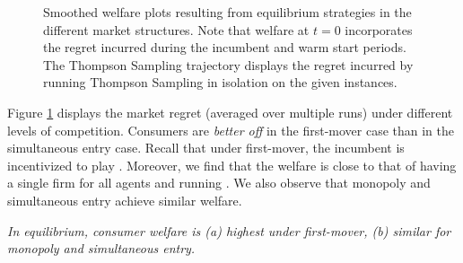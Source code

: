 \documentclass[../competing_bandits_with_appendix.tex]{subfiles}
\begin{document}
\begin{figure}[bth]
\caption{\footnotesize Smoothed welfare plots resulting from equilibrium strategies in the different market structures. Note that welfare at $t = 0$ incorporates the regret incurred during the incumbent and warm start periods. The Thompson Sampling trajectory displays the regret incurred by running Thompson Sampling in isolation on the given instances.}
\label{eq_regret}
\end{figure}

Figure \ref{eq_regret} displays the market regret (averaged
  over multiple runs) under different levels of competition.
Consumers are \textit{better off} in the first-mover case than in
the simultaneous entry case. Recall that under first-mover, the incumbent is incentivized to play \Thompson. Moreover, we find that the welfare is close to that of having a single firm for all agents and running \Thompson. We also observe that monopoly and simultaneous entry achieve similar welfare.

\begin{finding}\label{find:welfare}
\textit{In equilibrium, consumer welfare is (a) highest under first-mover, (b) similar for monopoly and simultaneous entry.
}
\end{finding}
\end{document}
